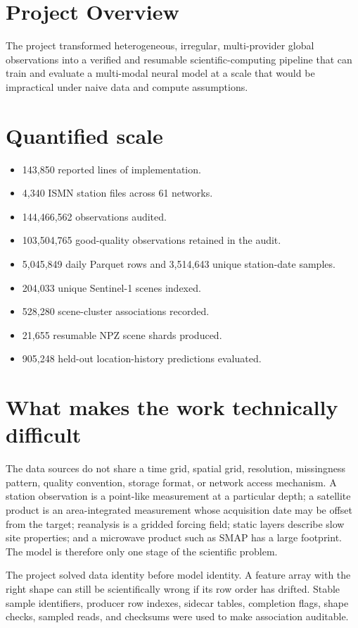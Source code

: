\documentclass[12pt,a4paper]{report}
\newcommand{\feat}[1]{#1\par}
\begin{document}
\section*{Project Overview}
The project transformed heterogeneous, irregular, multi-provider global
observations into a verified and resumable scientific-computing pipeline that
can train and evaluate a multi-modal neural model at a scale that would be
impractical under naive data and compute assumptions.

\section*{Quantified scale}
\begin{itemize}
    \item 143,850 reported lines of implementation.
    \item 4,340 ISMN station files across 61 networks.
    \item 144,466,562 observations audited.
    \item 103,504,765 good-quality observations retained in the audit.
    \item 5,045,849 daily Parquet rows and 3,514,643 unique station-date samples.
    \item 204,033 unique Sentinel-1 scenes indexed.
    \item 528,280 scene-cluster associations recorded.
    \item 21,655 resumable NPZ scene shards produced.
    \item 905,248 held-out location-history predictions evaluated.
\end{itemize}

\section*{What makes the work technically difficult}
The data sources do not share a time grid, spatial grid, resolution, missingness
pattern, quality convention, storage format, or network access mechanism. A
station observation is a point-like measurement at a particular depth; a
satellite product is an area-integrated measurement whose acquisition date may
be offset from the target; reanalysis is a gridded forcing field; static layers
describe slow site properties; and a microwave product such as SMAP has a large
footprint. The model is therefore only one stage of the scientific problem.

\feat{The project solved data identity before model identity. A feature array
with the right shape can still be scientifically wrong if its row order has
drifted. Stable sample identifiers, producer row indexes, sidecar tables,
completion flags, shape checks, sampled reads, and checksums were used to make
association auditable.}
\end{document}
